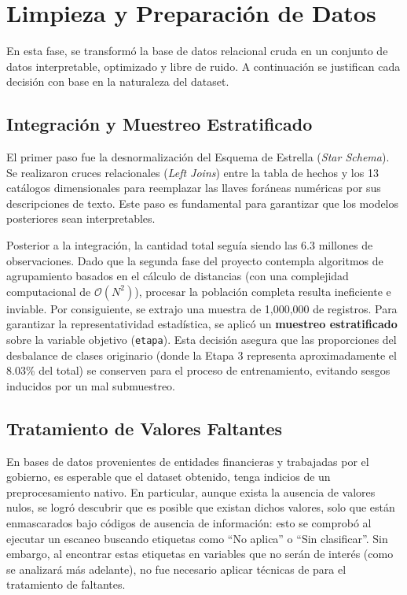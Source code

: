 \section{Limpieza y Preparación de Datos}
En esta fase, se transformó la base de datos relacional cruda en un conjunto de datos interpretable,  optimizado y libre de ruido. A continuación se justifican cada decisión con base en la naturaleza del dataset.

\subsection{Integración y Muestreo Estratificado}
El primer paso fue la desnormalización del Esquema de Estrella (\textit{Star Schema}). Se realizaron cruces relacionales (\textit{Left Joins}) entre la tabla de hechos y los 13 catálogos dimensionales para reemplazar las llaves foráneas numéricas por sus descripciones de texto. Este paso es fundamental para garantizar que los modelos posteriores sean interpretables.

Posterior a la integración, la cantidad total seguía siendo las 6.3 millones de observaciones. Dado que la segunda fase del proyecto contempla algoritmos de agrupamiento basados en el cálculo de distancias (con una complejidad computacional de $\mathcal{O}(N^2)$), procesar la población completa resulta ineficiente e inviable. Por consiguiente, se extrajo una muestra de 1,000,000 de registros. Para garantizar la representatividad estadística, se aplicó un \textbf{muestreo estratificado} sobre la variable objetivo (\texttt{etapa}). Esta decisión asegura que las proporciones del desbalance de clases originario (donde la Etapa 3 representa aproximadamente el 8.03\% del total) se conserven para el proceso de entrenamiento, evitando sesgos inducidos por un mal submuestreo.

\subsection{Tratamiento de Valores Faltantes}
En bases de datos provenientes de entidades financieras y trabajadas por el gobierno, es esperable que el dataset obtenido, tenga indicios de un preprocesamiento nativo. En particular, aunque exista la ausencia de valores nulos, se logró descubrir que es posible que existan dichos valores, solo que están enmascarados bajo códigos de ausencia de información: esto se comprobó al ejecutar un escaneo buscando etiquetas como ``No aplica'' o ``Sin clasificar''. Sin embargo, al encontrar estas etiquetas en variables que no serán de interés (como se analizará más adelante), no fue necesario aplicar técnicas de para el tratamiento de faltantes.

